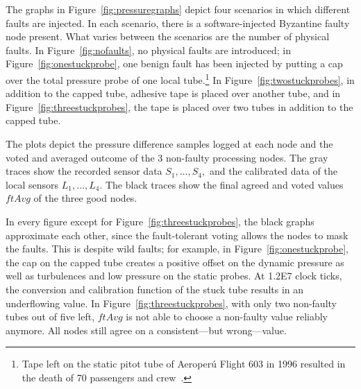




The graphs in Figure~\ref{fig:pressuregraphs} depict four scenarios in which
different faults are injected.  In each scenario, there is a software-injected
Byzantine faulty node present.  What varies between the scenarios are the number
of physical faults.  In Figure~\ref{fig:nofaults}, no physical faults are
introduced; in Figure~\ref{fig:onestuckprobe}, one benign fault has been injected by
  putting a cap over the total pressure probe of one local tube.\footnote{Tape
    left on the static pitot tube of Aeroper\'{u} Flight 603 in 1996 resulted in
    the death of 70 passengers and crew~\cite{aeroperu}.}  In
  Figure~\ref{fig:twostuckprobes}, in addition to the capped tube, adhesive tape is placed over another
  tube, and in Figure~\ref{fig:threestuckprobes}, the tape is placed over two
  tubes in addition to the capped tube.

The plots depict the pressure difference samples logged at each node and the
voted and averaged outcome of the 3 non-faulty processing nodes.  The
gray traces show the recorded sensor data $S_1, \dots, S_4,$ and the
calibrated data of the local sensors $L_1, \dots, L_4$. The black
traces show the final agreed and voted values $ftAvg$ of the three
good nodes.

In every figure except for Figure~\ref{fig:threestuckprobes}, the black graphs
approximate each other, since the fault-tolerant voting allows the nodes to mask
the faults.  This is despite wild faults; for example, in
Figure~\ref{fig:onestuckprobe}, the cap on the capped tube creates a positive
offset on the dynamic pressure as well as turbulences and low pressure on the
static probes. At 1.2E7 clock ticks, the conversion and calibration function of
the stuck tube results in an underflowing value.  In
Figure~\ref{fig:threestuckprobes}, with only two non-faulty tubes out of five
left, $ftAvg$ is not able to choose a non-faulty value reliably anymore.
All nodes still agree on a consistent---but wrong---value.
